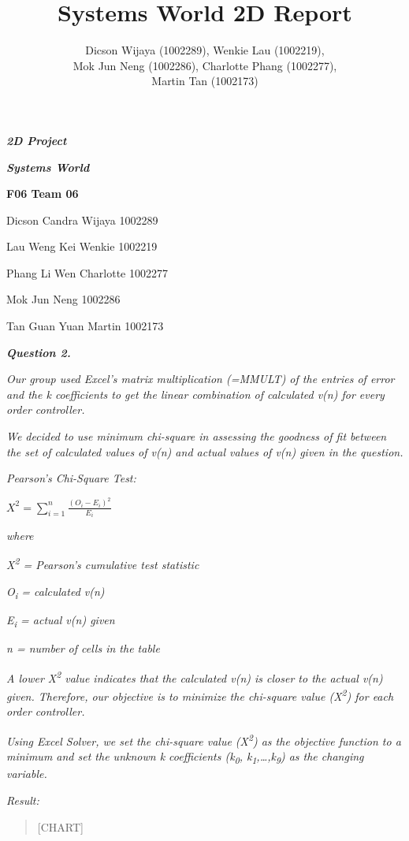 \documentclass[]{article}
\date{}
\author{Dicson Wijaya (1002289), Wenkie Lau (1002219), \\ Mok Jun Neng (1002286), Charlotte Phang (1002277),\\ Martin Tan (1002173)}
\title{Systems World 2D Report}
\begin{document}
	\maketitle

\emph{\textbf{2D Project}}

\emph{\textbf{Systems World}}

\textbf{F06 Team 06}

Dicson Candra Wijaya 1002289

Lau Weng Kei Wenkie 1002219

Phang Li Wen Charlotte 1002277

Mok Jun Neng 1002286

Tan Guan Yuan Martin 1002173

\emph{\textbf{Question 2.}}

\emph{Our group used Excel's matrix multiplication (=MMULT) of the
entries of error and the k coefficients to get the linear combination of
calculated v(n) for every order controller.}

\emph{We decided to use minimum chi-square in assessing the goodness of
fit between the set of calculated values of v(n) and actual values of
v(n) given in the question.}

\emph{Pearson's Chi-Square Test: }

\(X^{2} = \sum_{i = 1}^{n}\frac{\left( O_{i} - E_{i} \right)^{2}}{E_{i}}\)

\emph{where}

\emph{X\textsuperscript{2} = Pearson's cumulative test statistic}

\emph{O\textsubscript{i} = calculated v(n)}

\emph{E\textsubscript{i} = actual v(n) given}

\emph{n = number of cells in the table}

\emph{A lower X\textsuperscript{2} value indicates that the calculated
v(n) is closer to the actual v(n) given. Therefore, our objective is to
minimize the chi-square value (X\textsuperscript{2}) for each order
controller.}

\emph{Using Excel Solver, we set the chi-square value
(X\textsuperscript{2}) as the objective function to a minimum and set
the unknown k coefficients (k\textsubscript{0},
k\textsubscript{1},\ldots{},k\textsubscript{9}) as the changing
variable.}

\emph{Result:}

\begin{quote}
{{[}CHART{]}}
\end{quote}
\end{document}
